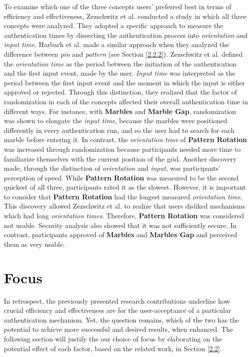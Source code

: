 To examine which one of the three concepts users' preferred best in terms of efficiency and effectiveness, Zezschwitz et al. \cite{Marbles} conducted a study in which all three concepts were analyzed. They adopted a specific approach to measure the authentication times by dissecting the authentication process into \textit{orientation} and \textit{input time}. Harbach et al. \cite{AnatomySmartphone} made a similar approach when they analyzed the difference between \textit{pin} and \textit{pattern} (see Section \ref{2.2.2}). Zezschwitz et al. \cite{Marbles} defined the \textit{orientation time} as the period between the initiation of the authentication and the first input event, made by the user. \textit{Input time} was interpreted as the period between the first input event and the moment in which the input is either approved or rejected. Through this distinction, they realized that the factor of randomization in each of the concepts affected their overall authentication time in different ways. For instance, with \textbf{Marbles} and \textbf{Marble Gap}, randomization was shown to elongate the \textit{input time}, because the marbles were positioned differently in every authentication run, and so the user had to search for each marble before entering it. In contrast, the \textit{orientation time} of \textbf{Pattern Rotation} was increased through randomization because participants needed more time to familiarize themselves with the current position of the grid. Another discovery made, through the distinction of \textit{orientation} and \textit{input}, was participants' perception of speed. While \textbf{Pattern Rotation} was measured to be the second quickest of all three, participants rated it as the slowest. However, it is important to consider that \textbf{Pattern Rotation} had the longest measured \textit{orientation time}. This discovery allowed Zezschwitz et al. \cite{Marbles} to realize that users disliked mechanisms which had long \textit{orientation times}. Therefore, \textbf{Pattern Rotation} was considered not usable. Security analysis also showed that it was not sufficiently secure. In contrast, participants approved of \textbf{Marbles} and \textbf{Marbles Gap} and perceived them as very usable.

\section{Focus} \label{2.3}

In retrospect, the previously presented research contributions underline how crucial efficiency and effectiveness are for the user-acceptance of a particular authentication mechanism. Yet, the question remains, which of the two has the potential to achieve more successful and desired results, when enhanced. The following section will justify the our choice of focus by elaborating on the potential effect of each factor, based on the related work, in Section \ref{2.2}. \\

